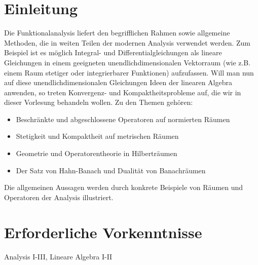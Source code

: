 


\section*{Einleitung}

Die Funktionalanalysis liefert den begrifflichen Rahmen sowie allgemeine Methoden, die in weiten Teilen der modernen Analysis verwendet werden. Zum Beispiel ist es möglich Integral- und Differentialgleichungen als lineare Gleichungen in einem geeigneten unendlichdimensionalen Vektorraum (wie z.B. einem Raum stetiger oder integrierbarer Funktionen) aufzufassen. Will man nun auf diese unendlichdimensionalen Gleichungen Ideen der linearen Algebra anwenden, so treten Konvergenz- und Kompaktheitsprobleme auf, die wir in dieser Vorlesung behandeln wollen. Zu den Themen gehören:

  \begin{itemize}
     \item Beschränkte und abgeschlossene Operatoren auf normierten Räumen
     \item Stetigkeit und Kompaktheit auf metrischen Räumen
     \item Geometrie und Operatorentheorie in Hilberträumen
     \item Der Satz von Hahn-Banach und Dualität von Banachräumen    
  \end{itemize}
  
Die allgemeinen Aussagen werden durch konkrete Beispiele von Räumen und Operatoren der Analysis illustriert.

\section*{Erforderliche Vorkenntnisse}
Analysis I-III, Lineare Algebra I-II